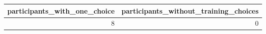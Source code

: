 \begin{tabular}{rr}
\toprule
participants_with_one_choice & participants_without_training_choices \\
\midrule
8 & 0 \\
\bottomrule
\end{tabular}
